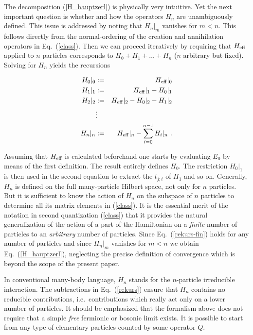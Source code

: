 The decomposition (\ref{H_hauptzerl}) is physically very intuitive.
Yet the next important question is whether and how the operators $H_n$ are
unambiguously defined. This issue is addressed by noting that
$H_n|_m$ vanishes for $m<n$. This follows directly from the normal-ordering
of the creation and annihilation operators in Eq.~(\ref{class}).
Then we can proceed iteratively by requiring that 
$H_{\rm eff}$ applied to $n$ particles corresponds to 
$H_0+H_1+\ldots +H_n$ ($n$ arbitrary but fixed). Solving for 
$H_n$ yields the recursions
\begin{mathletters}
\label{rekurs}
\begin{eqnarray}
  H_0|_0&:=& H_{\rm eff}|_0\\
  H_1|_1&:=& H_{\rm eff}|_1-H_0|_1\\
  H_2|_2&:=& H_{\rm eff}|_2-H_0|_2-H_1|_2\\
  &\vdots&\nonumber \\
  H_n|_n&:=& H_{\rm eff}|_n-\sum_{i=0}^{n-1}H_i|_n\ .
\label{rekurs-fin}
\end{eqnarray}
\end{mathletters}
Assuming that $H_{\rm eff}$ is calculated beforehand one starts
by evaluating $E_0$ by means of the first definition. The result
entirely defines $H_0$. The restriction $H_0|_1$ is then used in the
second equation to extract the $t_{j;i}$ of $H_1$ and so on.  
Generally, $H_n$ is defined on the full many-particle
Hilbert space, not only for $n$ particles. But it is sufficient to know
the action of $H_n$ on the subspace of $n$ particles to determine all its
matrix elements in (\ref{class}). It is the essential merit of
the notation in second quantization (\ref{class}) that it provides
the natural generalization of the action of a part of the Hamiltonian 
on a {\it finite} number of particles to an {\it arbitrary}
 number of particles.
Since Eq.~(\ref{rekurs-fin}) holds for any number of particles and since
$H_n|_m$ vanishes for $m<n$ we obtain
Eq.~(\ref{H_hauptzerl}), neglecting the precise definition of 
convergence which is beyond the scope of the present paper.

In conventional many-body language, $H_n$ stands for the $n$-particle
irreducible interaction. The subtractions in Eq.~(\ref{rekurs}) ensure
that $H_n$ contains no reducible contributions, i.e.\ contributions
which really act only on a lower number of particles. 
It should be emphasized that the formalism above does not require that a
simple {\em free} fermionic or bosonic limit exists. It is possible to
start from any type of elementary particles counted by some
operator $Q$.

